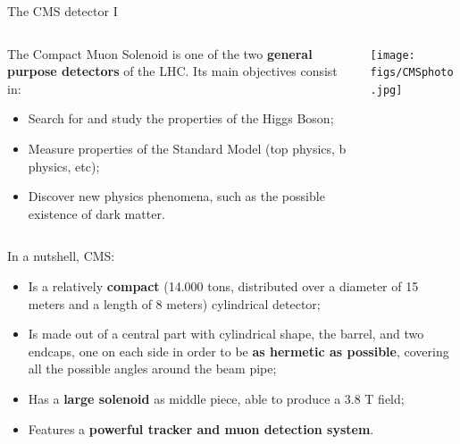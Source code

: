 \documentclass[8pt]{beamer}
\begin{document}
\begin{frame}{The CMS detector I}
\justifying

\begin{columns}
\begin{column}{0.56	\textwidth}
\justifying
The \alert{Compact Muon Solenoid} is one of the two \textbf{general purpose detectors} of the LHC. Its main objectives consist in:
\begin{itemize}
\justifying
\item Search for and study the properties of the Higgs Boson;
\item Measure properties of the Standard Model (top physics, b physics, etc);
\item Discover new physics phenomena, such as the possible existence of dark matter.
\end{itemize}
\end{column}
\begin{column}{0.40	\textwidth}
\begin{center}
\texttt{[image: figs/CMSphoto.jpg]}
\end{center}
\end{column}
\end{columns} \vfill

In a nutshell, CMS:
\begin{itemize}
\justifying
\item Is a relatively \textbf{compact} (14.000 tons, distributed over a diameter of 15 meters and a length of 8 meters) cylindrical detector; 
\item Is made out of a central part with cylindrical shape, the barrel, and two endcaps, one on each side in order to be \textbf{as hermetic as possible}, covering all the possible angles around the beam pipe;
\item Has a \textbf{large solenoid} as middle piece, able to produce a 3.8 T field;
\item Features a \textbf{powerful tracker and muon detection system}.
\end{itemize} \vfill
\end{frame}
\end{document}
